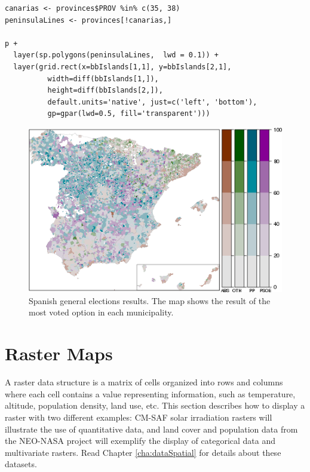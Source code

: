 \documentclass[smallroyalvopaper]{memoir}
\begin{document}
\lstset{language=R,numbers=none}
\begin{lstlisting}
canarias <- provinces$PROV %in% c(35, 38)
peninsulaLines <- provinces[!canarias,]

p +
  layer(sp.polygons(peninsulaLines,  lwd = 0.1)) +
  layer(grid.rect(x=bbIslands[1,1], y=bbIslands[2,1],
		  width=diff(bbIslands[1,]),
		  height=diff(bbIslands[2,]),
		  default.units='native', just=c('left', 'bottom'),
		  gp=gpar(lwd=0.5, fill='transparent')))
\end{lstlisting}

\begin{figure}[htb]
\centering
\includegraphics[width=.9\linewidth]{figs/mapLegends.png}
\caption{\label{fig:mapLegends}Spanish general elections results. The map shows the result of the most voted option in each municipality.}
\end{figure}

\section{Raster Maps}
\label{sec-1}
\label{cha:raster}

A raster data structure is a matrix of cells organized into rows and
columns where each cell contains a value representing information,
such as temperature, altitude, population density, land use, etc.
This section describes how to display a raster with two different
examples: CM-SAF solar irradiation rasters will illustrate the use of
quantitative data, and land cover and population data from the
NEO-NASA project will exemplify the display of categorical data and
multivariate rasters. Read Chapter \ref{cha:dataSpatial} for
details about these datasets.
\end{document}
